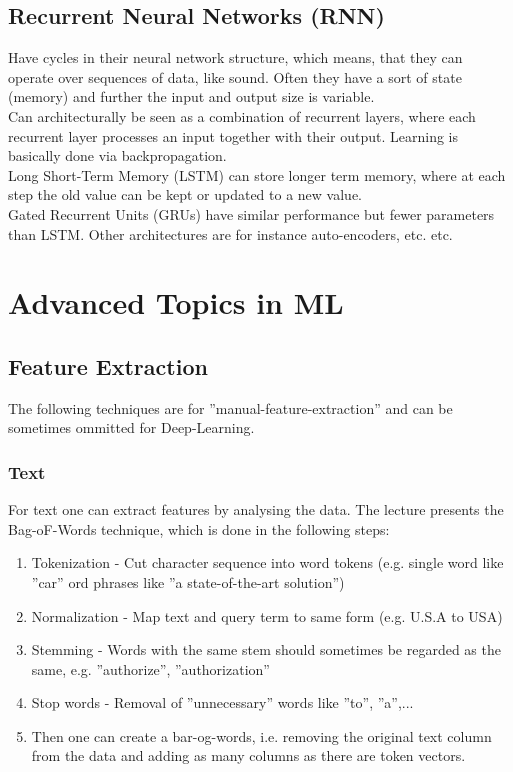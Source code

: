 \documentclass[12pt,a4paper]{article}
\begin{document}
\subsection{Recurrent Neural Networks (RNN)}

\noindent Have cycles in their neural network structure, which means, that they can operate over sequences of data, like sound. Often they have a sort of state (memory) and further the input and output size is variable.\\
Can architecturally be seen as a combination of recurrent layers, where each recurrent layer processes an input together with their output. Learning is basically done via backpropagation.\\[1em]
Long Short-Term Memory (LSTM) can store longer term memory, where at each step the old value can be kept or updated to a new value.\\
Gated Recurrent Units (GRUs) have similar performance but fewer parameters than LSTM. Other architectures are for instance auto-encoders, etc. etc.


\newpage
\section{Advanced Topics in ML}

\subsection{Feature Extraction}
\label{subsec:feature-extraction}

\noindent The following techniques are for ''manual-feature-extraction'' and can be sometimes ommitted for Deep-Learning.

\subsubsection{Text}

\noindent For text one can extract features by analysing the data. The lecture presents the Bag-oF-Words technique, which is done in the following steps:

\begin{enumerate}
    \item Tokenization - Cut character sequence into word tokens (e.g. single word like ''car'' ord phrases like ''a state-of-the-art solution'')
    \item Normalization - Map text and query term to same form (e.g. U.S.A to USA)
    \item Stemming - Words with the same stem should sometimes be regarded as the same, e.g. ''authorize'', ''authorization''
    \item Stop words - Removal of ''unnecessary'' words like ''to'', ''a'',...
    \item Then one can create a bar-og-words, i.e. removing the original text column from the data and adding as many columns as there are token vectors.
\end{enumerate}
\end{document}
